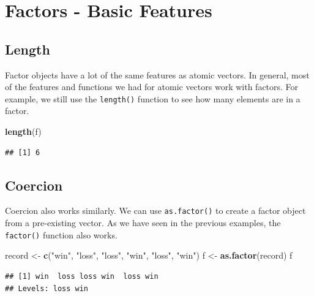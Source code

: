 \documentclass[
]{book}
\newenvironment{Shaded}{\begin{snugshade}}{\end{snugshade}}
\newcommand{\KeywordTok}[1]{\textcolor[rgb]{0.13,0.29,0.53}{\textbf{#1}}}
\newcommand{\NormalTok}[1]{#1}
\newcommand{\StringTok}[1]{\textcolor[rgb]{0.31,0.60,0.02}{#1}}
\begin{document}
\hypertarget{factors---basic-features}{%
\section{Factors - Basic Features}\label{factors---basic-features}}

\hypertarget{length-1}{%
\subsection{Length}\label{length-1}}

Factor objects have a lot of the same features as atomic vectors. In general, most of the features and functions we had for atomic vectors work with factors. For example, we still use the \texttt{length()} function to see how many elements are in a factor.

\begin{Shaded}
\begin{Highlighting}[]
\KeywordTok{length}\NormalTok{(f)}
\end{Highlighting}
\end{Shaded}

\begin{verbatim}
## [1] 6
\end{verbatim}

\hypertarget{coercion-1}{%
\subsection{Coercion}\label{coercion-1}}

Coercion also works similarly. We can use \texttt{as.factor()} to create a factor object from a pre-existing vector. As we have seen in the previous examples, the \texttt{factor()} function also works.

\begin{Shaded}
\begin{Highlighting}[]
\NormalTok{record <-}\StringTok{ }\KeywordTok{c}\NormalTok{(}\StringTok{"win"}\NormalTok{, }\StringTok{"loss"}\NormalTok{,}
    \StringTok{"loss"}\NormalTok{, }\StringTok{"win"}\NormalTok{, }\StringTok{"loss"}\NormalTok{,}
    \StringTok{"win"}\NormalTok{)}
\NormalTok{f <-}\StringTok{ }\KeywordTok{as.factor}\NormalTok{(record)}
\NormalTok{f}
\end{Highlighting}
\end{Shaded}

\begin{verbatim}
## [1] win  loss loss win  loss win 
## Levels: loss win
\end{verbatim}
\end{document}
